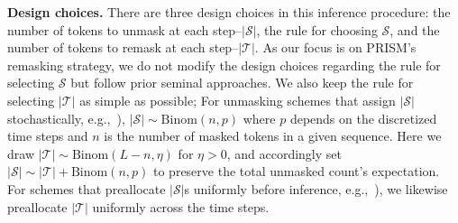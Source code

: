 \textbf{Design choices.} There are three design choices in this inference procedure: the number of tokens to unmask at each step--$|\mathcal{S}|$, the rule for choosing $\mathcal{S}$, and the number of tokens to remask at each step--$|\mathcal{T}|$. As our focus is on PRISM's remasking strategy, we do not modify the design choices regarding the rule for selecting $\mathcal{S}$ but follow prior seminal approaches. We also keep the rule for selecting $|\mathcal{T}|$ as simple as possible; For unmasking schemes that assign $|\mathcal{S}|$ stochastically, e.g.,~\cite{sahoo2024simple,wang2025remasking,shi2024simplified,gat2024discrete}), $|\mathcal{S}|\sim \mathrm{Binom}(n,p)$ where $p$ depends on the discretized time steps and $n$ is the number of masked tokens in a given sequence. Here we draw $|\mathcal{T}|\sim \mathrm{Binom}(L-n,\eta)$ for $\eta>0$, and accordingly set $|\mathcal{S}|\sim |\mathcal{T}|+\mathrm{Binom}(n,p)$ to preserve the total unmasked count's expectation. For schemes that preallocate $|\mathcal{S}|$s uniformly before inference, e.g.,~\cite{nie2025large}), we likewise preallocate $|\mathcal{T}|$ uniformly across the time steps.